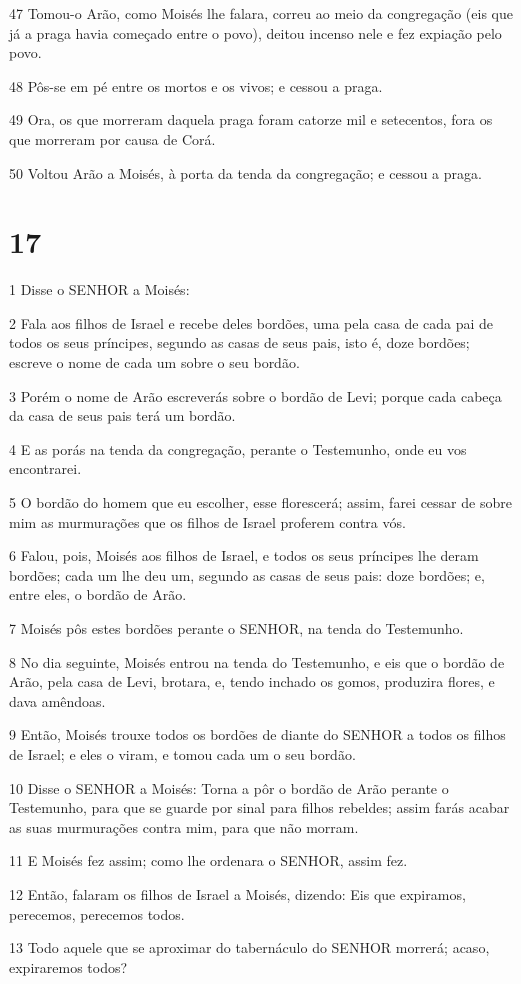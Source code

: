 \par 47 Tomou-o Arão, como Moisés lhe falara, correu ao meio da congregação (eis que já a praga havia começado entre o povo), deitou incenso nele e fez expiação pelo povo.
\par 48 Pôs-se em pé entre os mortos e os vivos; e cessou a praga.
\par 49 Ora, os que morreram daquela praga foram catorze mil e setecentos, fora os que morreram por causa de Corá.
\par 50 Voltou Arão a Moisés, à porta da tenda da congregação; e cessou a praga.

\chapter{17}

\par 1 Disse o SENHOR a Moisés:
\par 2 Fala aos filhos de Israel e recebe deles bordões, uma pela casa de cada pai de todos os seus príncipes, segundo as casas de seus pais, isto é, doze bordões; escreve o nome de cada um sobre o seu bordão.
\par 3 Porém o nome de Arão escreverás sobre o bordão de Levi; porque cada cabeça da casa de seus pais terá um bordão.
\par 4 E as porás na tenda da congregação, perante o Testemunho, onde eu vos encontrarei.
\par 5 O bordão do homem que eu escolher, esse florescerá; assim, farei cessar de sobre mim as murmurações que os filhos de Israel proferem contra vós.
\par 6 Falou, pois, Moisés aos filhos de Israel, e todos os seus príncipes lhe deram bordões; cada um lhe deu um, segundo as casas de seus pais: doze bordões; e, entre eles, o bordão de Arão.
\par 7 Moisés pôs estes bordões perante o SENHOR, na tenda do Testemunho.
\par 8 No dia seguinte, Moisés entrou na tenda do Testemunho, e eis que o bordão de Arão, pela casa de Levi, brotara, e, tendo inchado os gomos, produzira flores, e dava amêndoas.
\par 9 Então, Moisés trouxe todos os bordões de diante do SENHOR a todos os filhos de Israel; e eles o viram, e tomou cada um o seu bordão.
\par 10 Disse o SENHOR a Moisés: Torna a pôr o bordão de Arão perante o Testemunho, para que se guarde por sinal para filhos rebeldes; assim farás acabar as suas murmurações contra mim, para que não morram.
\par 11 E Moisés fez assim; como lhe ordenara o SENHOR, assim fez.
\par 12 Então, falaram os filhos de Israel a Moisés, dizendo: Eis que expiramos, perecemos, perecemos todos.
\par 13 Todo aquele que se aproximar do tabernáculo do SENHOR morrerá; acaso, expiraremos todos?

